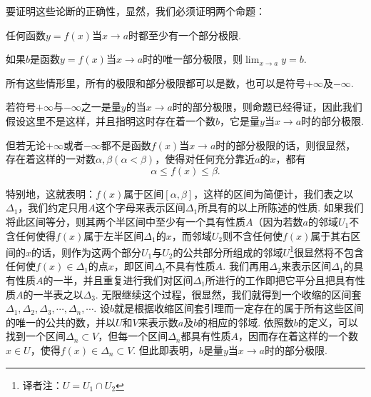 \documentclass[color=cyan,mathpazo,titlestyle=hang]{elegantbook_mac}
\begin{document}
要证明这些论断的正确性，显然，我们必须证明两个命题：

\begin{newprop}
\label{part-lim}
任何函数$y=f(x)$当$x\to a$时都至少有一个部分极限.
\end{newprop}

\begin{newprop}
如果$b$是函数$y=f(x)$当$x\to a$时的唯一部分极限，则$\lim_{x\to a}y = b$.
\label{part-lim-2}
\end{newprop}

所有这些情形里，所有的极限和部分极限都可以是数，也可以是符号$+\infty$及$-\infty$.

\begin{newproof}[第一个命题]
若符号$+\infty$与$-\infty$之一是量$y$的当$x\to a$时的部分极限，则命题已经得证，因此我们假设这里不是这样，并且指明这时存在着一个数$b$，它是量$y$当$x\to a$时的部分极限. 

但若无论$+\infty$或者$-\infty$都不是函数$f(x)$当$x\to a$时的部分极限的话，则很显然，存在着这样的一对数$\alpha,\beta (\alpha < \beta)$，使得对任何充分靠近$a$的$x$，都有$$\alpha \leqslant f(x) \leqslant \beta.$$

特别地，这就表明：$f(x)$属于区间$[\alpha, \beta]$，这样的区间为简便计，我们表之以$\Delta_1$，我们约定只用$A$这个字母来表示区间$\Delta_1$所具有的以上所陈述的性质. 如果我们将此区间等分，则其两个半区间中至少有一个具有性质$A$（因为若数$a$的邻域$U_1$不含任何使得$f(x)$属于左半区间$\Delta_1$的$x$，而邻域$U_2$则不含任何使$f(x)$属于其右区间的$x$的话，则作为这两个部分$U_1$与$U_2$的公共部分所组成的邻域$U$\footnote{译者注：$U = U_1 \cap U_2$}很显然将不包含任何使$f(x) \in \Delta_1$的点$x$，即区间$\Delta_t$不具有性质$A$. 我们再用$\Delta_2$来表示区间$\Delta_1$的具有性质$A$的一半，并且重复进行我们对区间$\Delta_1$所进行的工作即把它平分且把具有性质$A$的一半表之以$\Delta_3$. 无限继续这个过程，很显然，我们就得到一个收缩的区间套$\Delta_1, \Delta_2, \Delta_3, \cdots, \Delta_n, \cdots$. 设$b$就是根据收缩区间套引理而一定存在的属于所有这些区间的唯一的公共的数，并以$U$和$V$来表示数$a$及$b$的相应的邻域. 依照数$b$的定义，可以找到一个区间$\Delta_n \subset V$，但每一个区间$\Delta_n$都具有性质$A$，因而存在着这样的一个数$x\in U$，使得$f(x)\in \Delta_n \subset V$. 但此即表明，$b$是量$y$当$x\to a$时的部分极限.
\end{newproof}
\end{document}
